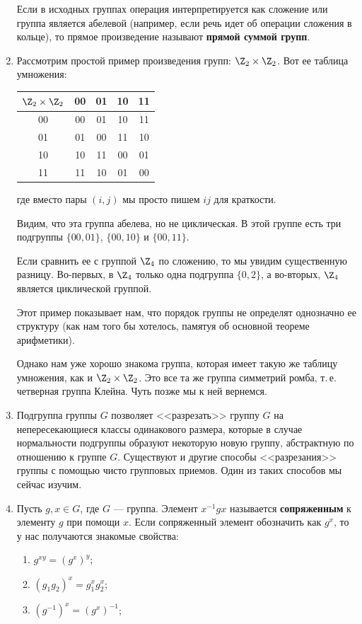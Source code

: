 \begin{enumerate}
Если в исходных группах операция интерпретируется как сложение или группа является абелевой (например, если речь идет об операции сложения в кольце), то прямое произведение называют \textbf{прямой суммой групп}.


\item Рассмотрим простой пример произведения групп: $\Z_2\times\Z_2$. Вот ее таблица умножения:

\begin{center}
\begin{tabular}{c|cccc}
$\Z_2\times\Z_2$ & 00 & 01 & 10 & 11\\  \hline
00 & 00 & 01 & 10 & 11 \\
01 & 01 & 00 & 11 & 10 \\
10 & 10 & 11 & 00 & 01 \\
11 & 11 & 10 & 01 & 00
\end{tabular}
\end{center}
где вместо пары $(i,j)$ мы просто пишем $ij$ для краткости.

Видим, что эта группа абелева, но не циклическая. В этой группе есть три подгруппы $\{00,01\}$, $\{00,10\}$ и $\{00,11\}$.

Если сравнить ее с группой $\Z_4$ по сложению, то мы увидим существенную разницу. Во-первых, в $\Z_4$ только одна подгруппа $\{0,2\}$, а во-вторых, $\Z_4$ является циклической группой.

Этот пример показывает нам, что порядок группы не определят однозначно ее структуру (как нам того бы хотелось, памятуя об основной теореме арифметики).

Однако нам уже хорошо знакома группа, которая имеет такую же таблицу умножения, как и $\Z_2\times\Z_2$. Это все та же группа симметрий ромба, т.\,е. четверная группа Клейна. Чуть позже мы к ней вернемся.




\item Подгруппа группы $G$ позволяет <<разрезать>> группу $G$ на непересекающиеся классы одинакового размера, которые в случае нормальности подгруппы образуют некоторую новую группу, абстрактную по отношению к группе $G$. Существуют и другие способы <<разрезания>> группы с помощью чисто групповых приемов. Один из таких способов мы сейчас изучим.

\item Пусть $g,x\in G$, где $G$ --- группа. Элемент $x^{-1}gx$ называется \textbf{сопряженным} к элементу $g$ при помощи $x$. Если сопряженный элемент обозначить как $g^x$, то у нас получаются знакомые свойства:
\begin{enumerate}[1)]
\item $g^{xy}=(g^x)^y$;
\item $(g_1g_2)^x=g_1^xg_2^x$;
\item $(g^{-1})^x=(g^x)^{-1}$;
\end{enumerate}


\end{enumerate}
